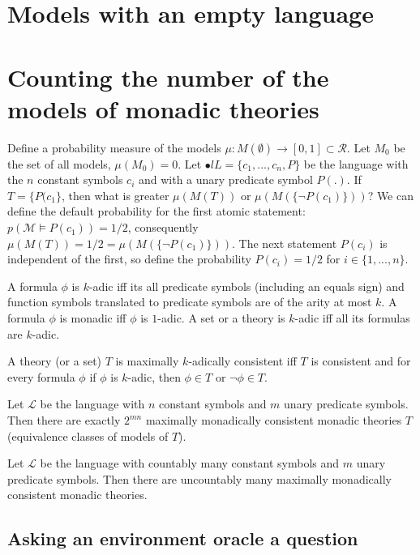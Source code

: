 \section{Models with an empty language}
\fi

\iffalse
\section{Counting the number of the models of monadic theories}
Define a probability measure of the models $\mu:M(\emptyset) \to [0,1] \subset \mathcal{R}$. Let $M_0$ be the set of all models, $\mu(M_0)=0$. Let $\mathcal{•}l{L}=\{c_1, ..., c_n, P\}$ be the language with the $n$ constant symbols $c_i$ and with a unary predicate symbol $P(.)$. If $T=\{P(c_1\}$, then what is greater $\mu(M(T))$ or $\mu(M(\{\neg P(c_1)\}))$? We can define the default probability for the first atomic statement: $p(\mathcal{M} \models P(c_1))=1/2$, consequently $\mu(M(T))=1/2=\mu(M(\{\neg P(c_1)\}))$. The next statement $P(c_i)$ is independent of the first, so define the probability $P(c_i)=1/2$ for $i \in \{1, ..., n\}$.
\begin{defn}
A formula $\phi$ is $k$-adic iff its all predicate symbols (including an equals sign) and function symbols translated to predicate symbols are of the arity at most $k$. A formula $\phi$ is monadic iff $\phi$ is $1$-adic. A set or a theory is $k$-adic iff all its formulas are $k$-adic.
\end{defn}
\begin{defn}
A theory (or a set) $T$ is maximally $k$-adically consistent iff $T$ is consistent and for every formula $\phi$ if $\phi$ is $k$-adic, then $\phi \in T$ or $\neg \phi \in T$.
\end{defn}
\begin{remark}
Let $\mathcal{L}$ be the language with $n$ constant symbols and $m$ unary predicate symbols. Then there are exactly $2^{mn}$ maximally monadically consistent monadic theories $T$ (equivalence classes of models of $T$).
\end{remark}
\begin{remark}
Let $\mathcal{L}$ be the language with countably many constant symbols and $m$ unary predicate symbols. Then there are uncountably many maximally monadically consistent monadic theories.
\end{remark}
\subsection{Asking an environment oracle a question}
